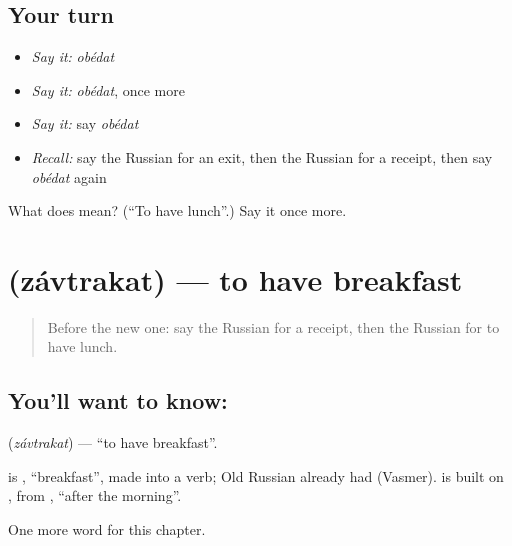 \subsection*{Your turn}
\begin{itemize}
\raggedright
  \item \emph{Say it:} \emph{obédat}
  \item \emph{Say it:} \emph{obédat}, once more
  \item \emph{Say it:} say \emph{obédat}
  \item \emph{Recall:} say the Russian for an exit, then the Russian for a receipt, then say \emph{obédat} again
\end{itemize}

\begin{tcolorbox}[breakable,colback=teal!4,colframe=teal!35!black,title={Before you move on}]
What does  mean? (\textquotedblleft{}To have lunch\textquotedblright{}.) Say it once more.
\end{tcolorbox}
\section[\texorpdfstring{\ru{завтракать} (závtrakat)}{завтракать (závtrakat)}]{ (závtrakat) — to have breakfast}

\label{lesson:RU-C140-zavtrakat}



\begin{quote}
Before the new one: say the Russian for a receipt, then the Russian for to have lunch.
\end{quote}

\subsection*{You'll want to know: }
\textbf{} (\emph{závtrakat}) — \textquotedblleft{}to have breakfast\textquotedblright{}.

\begin{cousinweb}
\textbf{} is \emph{}, \textquotedblleft{}breakfast\textquotedblright{}, made into a verb; Old Russian already had \emph{} (Vasmer). \emph{} is built on \emph{}, from \emph{ }, \textquotedblleft{}after the morning\textquotedblright{}.
\end{cousinweb}

\begin{grammarlens}[title={What you've built}]
One more word for this chapter.
\end{grammarlens}

